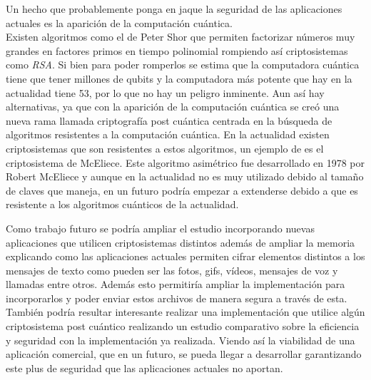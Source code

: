 Un hecho que probablemente ponga en jaque la seguridad de las aplicaciones actuales es la aparición de la computación cuántica.\\
Existen algoritmos como el de Peter Shor que permiten factorizar números muy grandes en factores primos en tiempo polinomial \cite{Shor1994} rompiendo así criptosistemas como \emph{RSA}. Si bien para poder romperlos se estima que la computadora cuántica tiene que tener millones de qubits y la computadora más potente que hay en la actualidad tiene 53, por lo que no hay un peligro inminente. Aun así hay alternativas, ya que con la aparición de la computación cuántica se creó una nueva rama llamada criptografía post cuántica centrada en la búsqueda de algoritmos resistentes a la computación cuántica. En la actualidad existen criptosistemas que son resistentes a estos algoritmos, un ejemplo de es el criptosistema de McEliece. Este algoritmo asimétrico fue desarrollado en 1978 por Robert McEliece y aunque en la actualidad no es muy utilizado debido al tamaño de claves que maneja, en un futuro podría empezar a extenderse debido a que es resistente a los algoritmos cuánticos de la actualidad.\par
Como trabajo futuro se podría ampliar el estudio incorporando nuevas aplicaciones que utilicen criptosistemas distintos además de ampliar la memoria explicando como las aplicaciones actuales permiten cifrar elementos distintos a los mensajes de texto como pueden ser las fotos, gifs, vídeos, mensajes de voz y llamadas entre otros. Además esto permitiría ampliar la implementación para incorporarlos y poder enviar estos archivos de manera segura a través de esta.\\
También podría resultar interesante realizar una implementación que utilice algún criptosistema post cuántico realizando un estudio comparativo sobre la eficiencia y seguridad con la implementación ya realizada. Viendo así la viabilidad de una aplicación comercial, que en un futuro, se pueda llegar a desarrollar garantizando este plus de seguridad que las aplicaciones actuales no aportan.
